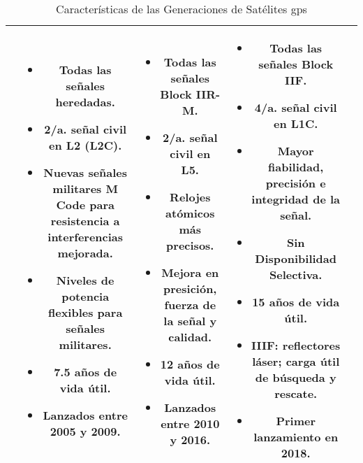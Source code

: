\begin{table}[h!]
\begin{tabular}{|c|c|c|c|c|}
{{            }
        } &
        \parbox[t]{2.5cm}{
            {\fontsize{9}{11}\selectfont
                \begin{itemize}[leftmargin=*]
                    \item Todas las señales heredadas.
                    \item 2/a. señal civil en L2 (L2C).
                    \item Nuevas señales militares M Code para resistencia a interferencias mejorada.
                    \item Niveles de potencia flexibles para señales militares.
                    \item 7.5 años de vida útil.
                    \item Lanzados entre 2005 y 2009.
                \end{itemize}
            }
        } &
        \parbox[t]{2.5cm}{
            {\fontsize{9}{11}\selectfont
                \begin{itemize}[leftmargin=*]
                    \item Todas las señales Block IIR-M.
                    \item 2/a. señal civil en L5.
                    \item Relojes atómicos más precisos.
                    \item Mejora en presición, fuerza de la señal y calidad.
                    \item 12 años de vida útil.
                    \item Lanzados entre 2010 y 2016.
                \end{itemize}
            }
        } &
        \parbox[t]{2.5cm}{
            {\fontsize{9}{11}\selectfont
                \begin{itemize}[leftmargin=*]
                    \item Todas las señales Block IIF.
                    \item 4/a. señal civil en L1C.
                    \item Mayor fiabilidad, precisión e integridad de la señal.
                    \item Sin Disponibilidad Selectiva.
                    \item 15 años de vida útil.
                    \item IIIF: reflectores láser; carga útil de búsqueda y rescate.
                    \item Primer lanzamiento en 2018.
                \end{itemize}
                \vspace{5pt}
            }
        } \\
        \hline
    \end{tabular}
    \caption{Características de las Generaciones de Satélites \gls{gps}}
    \label{tab:gps_satellites}
\end{table}